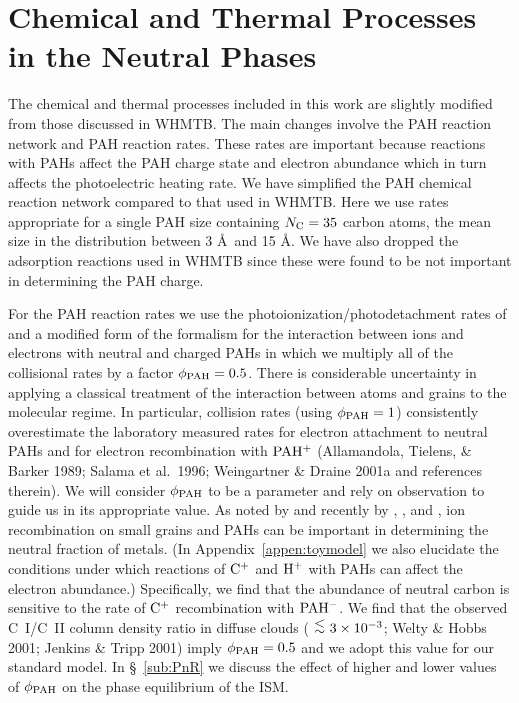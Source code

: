 \documentclass[12pt,preprint,flushrt]{aastex}
\newcommand{\al}{\mbox{ \raisebox{-.4ex}{$\stackrel{\textstyle <}{\sim}$} }}
\begin{document}
\section{Chemical  and Thermal Processes in the Neutral Phases}
\label{sec:thermal}

The chemical and thermal processes included in this work are slightly
modified from those discussed in WHMTB. The main changes involve the
PAH reaction network and PAH reaction rates. These rates are important
because reactions with PAHs affect the PAH charge state and
electron abundance which in turn affects the photoelectric heating
rate. We have simplified the PAH
chemical reaction network compared to that
used in WHMTB. Here we use rates appropriate for a single PAH size containing
$N_{\rm C} = 35$ carbon atoms, the mean size in the distribution between
3 \AA\ and 15 \AA. We have also dropped the adsorption reactions used
in WHMTB since these were found to be not important in determining
the PAH charge.

For the PAH reaction rates we use the
photoionization/photodetachment rates of \cite{bak94} and a modified form
of the \cite{draine87} formalism for the interaction between ions and
electrons with neutral and charged PAHs in which
we multiply all of the collisional rates by a factor $\phi_{\rm PAH} = 0.5$.
There is considerable uncertainty in applying a classical treatment
of the interaction between atoms and grains to the molecular regime.
In particular, collision rates (using $\phi_{\rm PAH} = 1$) consistently
overestimate the laboratory measured rates for electron
attachment to neutral PAHs and for electron recombination with
${\rm PAH^+}$ (Allamandola, Tielens, \& Barker 1989; Salama et al.\ 1996;
Weingartner \&
Draine 2001a and references therein). We will consider $\phi_{\rm PAH}$
to be a parameter and rely on observation to guide
us in its appropriate value.
As noted by \cite{lepp88} and recently by
\cite{bak98}, \cite{wel01}, and \cite{wei01b},
ion recombination on small grains and PAHs can be important in determining
the neutral fraction of metals.  (In Appendix~\ref{appen:toymodel} 
we also elucidate
the conditions under which reactions of ${\rm C^+}$ and ${\rm H^+}$
with PAHs can affect the
electron abundance.) Specifically, we find that the abundance of
neutral carbon is sensitive to the rate of ${\rm C^+}$ recombination
with ${\rm PAH^-}$. We find that the observed C~I/C~II column density
ratio in diffuse clouds ($\al 3\times 10^{-3}$; Welty \& Hobbs 2001; 
Jenkins \& Tripp 2001) imply $\phi_{\rm PAH} = 0.5$ and we adopt this
value for our standard model.
In \S~\ref{sub:PnR} we discuss the effect of higher and lower values of
$\phi_{\rm PAH}$ on the phase equilibrium of the ISM. 
\end{document}
